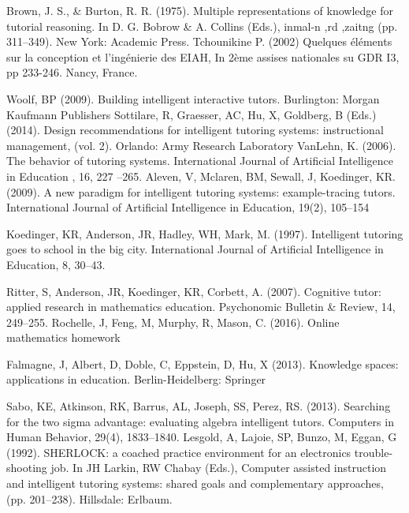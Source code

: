 \documentclass[letterpaper%
, twoside%
, 12pt%
,these%
, english%
,creativecommons,hyperref, withAlgo2e %
]{thETS}
\begin{document}
\begin{thebibliography}{01}
	  Brown, J. S., \& Burton, R. R. (1975). Multiple representations of knowledge for tutorial reasoning. In D. G. Bobrow \& A. Collins (Eds.), inmal-n ,rd ,zaitng (pp. 311--349). New York: Academic Press.
		  Tchounikine P. (2002) Quelques éléments sur la conception et l'ingénierie des EIAH, In 2ème assises nationales su GDR I3, pp 233-246. Nancy, France.
	
Woolf, BP (2009). Building intelligent interactive tutors. Burlington: Morgan
Kaufmann Publishers
			Sottilare, R, Graesser, AC, Hu, X, Goldberg, B (Eds.) (2014). Design recommendations
	for intelligent tutoring systems: instructional management, (vol. 2). Orlando:
	Army Research Laboratory
	VanLehn, K. (2006). The behavior of tutoring systems. International Journal of
	Artificial Intelligence in Education
	, 16, 227
	–265.	
	Aleven, V, Mclaren, BM, Sewall, J, Koedinger, KR. (2009). A new paradigm for
	intelligent tutoring systems: example-tracing tutors. International Journal of
	Artificial Intelligence in Education, 19(2), 105–154
	
	
		Koedinger, KR, Anderson, JR, Hadley, WH, Mark, M. (1997). Intelligent tutoring
	goes to school in the big city. International Journal of Artificial Intelligence in
	Education, 8, 30–43.
	
	
	
		Ritter, S, Anderson, JR, Koedinger, KR, Corbett, A. (2007). Cognitive tutor: applied
	research in mathematics education. Psychonomic Bulletin \& Review, 14, 249–255.
	Rochelle, J, Feng, M, Murphy, R, Mason, C. (2016). Online mathematics homework
	
	Falmagne, J, Albert, D, Doble, C, Eppstein, D, Hu, X (2013). Knowledge spaces:
	applications in education. Berlin-Heidelberg: Springer	
		
		
		Sabo, KE, Atkinson, RK, Barrus, AL, Joseph, SS, Perez, RS. (2013). Searching for the
		two sigma advantage: evaluating algebra intelligent tutors. Computers in
		Human Behavior, 29(4), 1833–1840.
			Lesgold, A, Lajoie, SP, Bunzo, M, Eggan, G (1992). SHERLOCK: a coached practice
		environment for an electronics trouble-shooting job. In JH Larkin, RW Chabay
		(Eds.), Computer assisted instruction and intelligent tutoring systems: shared
		goals and complementary approaches, (pp. 201–238). Hillsdale: Erlbaum.
		

\end{thebibliography}
\end{document}
